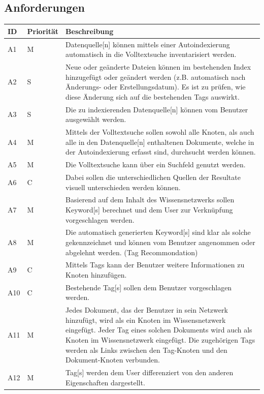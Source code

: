 \subsection{Anforderungen}\label{anforderungen}
\begin{longtable}{|p{1.5cm} | p{1.5cm} | p{8.1cm}|}
  \hline
    ID & Priorität & Beschreibung \\\hline
    A1 & M & \gls{Datenquelle}[n] können mittels einer Autoindexierung automatisch in die Volltextsuche inventarisiert werden.\\\hline
    A2 & S & Neue oder geänderte Dateien können im bestehenden Index hinzugefügt oder geändert werden (z.B. automatisch nach Änderungs- oder Erstellungsdatum). Es ist zu prüfen, wie diese Änderung sich auf die bestehenden Tags auswirkt. \\\hline
    A3 & S  & Die zu indexierenden \gls{Datenquelle}[n] können vom Benutzer ausgewählt werden.\\\hline
    A4 & M & Mittels der Volltextsuche sollen sowohl alle Knoten, als auch alle in den \gls{Datenquelle}[n] enthaltenen Dokumente, welche in der Autoindexierung erfasst sind, durchsucht werden können.\\\hline
    A5 & M & Die Volltextsuche kann über ein Suchfeld genutzt werden.\\\hline
    A6 & C & Dabei sollen die unterschiedlichen Quellen der Resultate visuell unterschieden werden können.\\\hline
    A7 & M & Basierend auf dem Inhalt des Wissensnetzwerks sollen \gls{Keyword}[s] berechnet und dem User zur Verknüpfung vorgeschlagen werden.\\\hline
    A8 & M & Die automatisch generierten \gls{Keyword}[s] sind klar als solche gekennzeichnet und können vom Benutzer angenommen oder abgelehnt werden. (\gls{Tag Recommondation})\\\hline
    A9 & C & Mittels \gls{Tags} kann der Benutzer weitere Informationen zu Knoten hinzufügen.\\\hline
    A10 & C & Bestehende \gls{Tag}[s] sollen dem Benutzer vorgeschlagen werden.\\\hline
    A11 & M & Jedes Dokument, das der Benutzer in sein Netzwerk hinzufügt, wird als ein Knoten im Wissensnetzwerk eingefügt. Jeder \gls{Tag} eines solchen Dokuments wird auch als Knoten im Wissensnetzwerk eingefügt. Die zugehörigen Tags werden als  Links zwischen den Tag-Knoten und den Dokument-Knoten verbunden.\\\hline
    A12 & M & \gls{Tag}[s] werden dem User differenziert von den anderen Eigenschaften dargestellt.\\\hline

\end{longtable}
